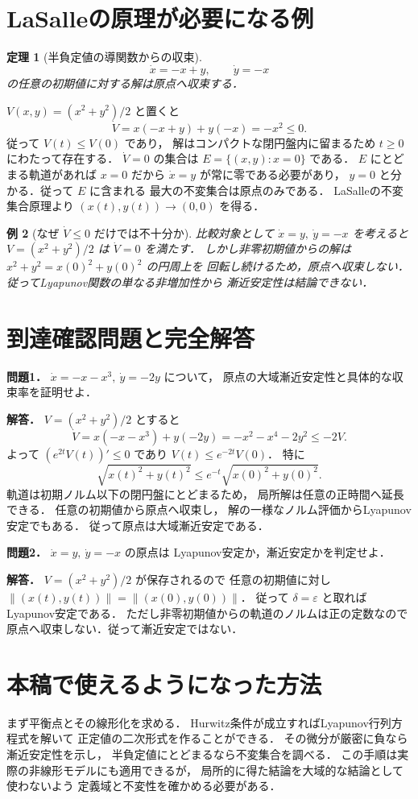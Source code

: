 \documentclass[a5paper,10pt,onecolumn]{jsarticle}
\makeatletter
\theoremstyle{mathnotetheorem}
\newtheorem{theorem}{定理}[section]
\newtheorem{example}[theorem]{例}
\renewcommand{\proofname}{証明}
\renewenvironment{proof}[1][\proofname]{%
  \par\pushQED{\qed}\normalfont\topsep4\p@\@plus2\p@\relax
  \trivlist\item[\hskip\labelsep\bfseries #1]\ignorespaces
}{\popQED\endtrivlist\@endpefalse}
\makeatother
\begin{document}
\section{LaSalleの原理が必要になる例}
\begin{theorem}[半負定値の導関数からの収束]\label{thm:lasalle-example}
\[
 \dot x=-x+y,\qquad \dot y=-x
\]
の任意の初期値に対する解は原点へ収束する．
\end{theorem}
\begin{proof}
$V(x,y)=(x^2+y^2)/2$ と置くと
\[
 \dot V=x(-x+y)+y(-x)=-x^2\le0.
\]
従って $V(t)\le V(0)$ であり，
解はコンパクトな閉円盤内に留まるため
$t\ge0$ にわたって存在する．
$\dot V=0$ の集合は $E=\{(x,y):x=0\}$ である．
$E$ にとどまる軌道があれば $x=0$ だから
$\dot x=y$ が常に零である必要があり，
$y=0$ と分かる．従って $E$ に含まれる
最大の不変集合は原点のみである．
LaSalleの不変集合原理より
$(x(t),y(t))\to(0,0)$ を得る．
\end{proof}
\begin{example}[なぜ $\dot V\le0$ だけでは不十分か]
比較対象として
$\dot x=y,\ \dot y=-x$ を考えると
$V=(x^2+y^2)/2$ は $\dot V=0$ を満たす．
しかし非零初期値からの解は
$x^2+y^2=x(0)^2+y(0)^2$ の円周上を
回転し続けるため，原点へ収束しない．
従ってLyapunov関数の単なる非増加性から
漸近安定性は結論できない．
\end{example}

\section*{到達確認問題と完全解答}
\noindent\textbf{問題1．}
$\dot x=-x-x^3,\ \dot y=-2y$ について，
原点の大域漸近安定性と具体的な収束率を証明せよ．

\medskip\noindent\textbf{解答．}
$V=(x^2+y^2)/2$ とすると
\[
 \dot V=x(-x-x^3)+y(-2y)
 =-x^2-x^4-2y^2\le-2V.
\]
よって $(e^{2t}V(t))'\le0$ であり
$V(t)\le e^{-2t}V(0)$．
特に
\[
 \sqrt{x(t)^2+y(t)^2}\le
 e^{-t}\sqrt{x(0)^2+y(0)^2}.
\]
軌道は初期ノルム以下の閉円盤にとどまるため，
局所解は任意の正時間へ延長できる．
任意の初期値から原点へ収束し，
解の一様なノルム評価からLyapunov安定でもある．
従って原点は大域漸近安定である．

\medskip\noindent\textbf{問題2．}
$\dot x=y,\ \dot y=-x$ の原点は
Lyapunov安定か，漸近安定かを判定せよ．

\medskip\noindent\textbf{解答．}
$V=(x^2+y^2)/2$ が保存されるので
任意の初期値に対し
$\|(x(t),y(t))\|=\|(x(0),y(0))\|$．
従って $\delta=\varepsilon$ と取れば
Lyapunov安定である．
ただし非零初期値からの軌道のノルムは正の定数なので
原点へ収束しない．従って漸近安定ではない．

\section*{本稿で使えるようになった方法}
\noindent まず平衡点とその線形化を求める．
Hurwitz条件が成立すればLyapunov行列方程式を解いて
正定値の二次形式を作ることができる．
その微分が厳密に負なら漸近安定性を示し，
半負定値にとどまるなら不変集合を調べる．
この手順は実際の非線形モデルにも適用できるが，
局所的に得た結論を大域的な結論として使わないよう
定義域と不変性を確かめる必要がある．
\end{document}
